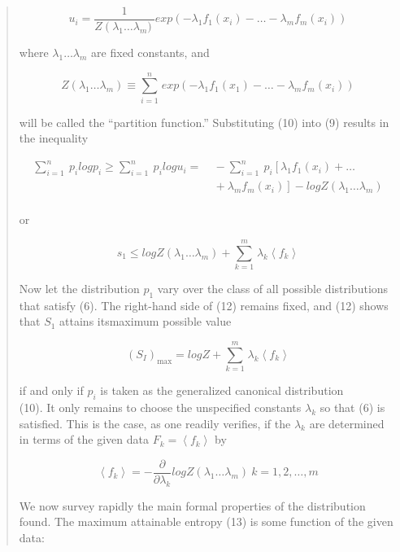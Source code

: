 \documentclass[]{article}
\begin{document}
\begin{quote}
\[u_{i} = \frac{1}{Z\left( \lambda_{1}\ldots\lambda_{m}) \right.\ }exp\left( - \lambda_{1}f_{1}\left( x_{i} \right) - \ldots - \lambda_{m}f_{m}\left( x_{i} \right) \right)\]

where \(\lambda_{1}\ldots\lambda_{m}\) are fixed constants, and

\[Z\left( \lambda_{1}\ldots\lambda_{m} \right) \equiv \sum_{i = 1}^{n}\mspace{2mu} exp\left( - \lambda_{1}f_{1}\left( x_{1} \right) - \ldots - \lambda_{m}f_{m}\left( x_{i} \right) \right)\]

will be called the ``partition function.'' Substituting (10) into (9)
results in the inequality

\[\begin{matrix}
\sum_{i = 1}^{n}\mspace{2mu}\mspace{2mu} p_{i}logp_{i} \geq \sum_{i = 1}^{n}\mspace{2mu}\mspace{2mu} p_{i}logu_{i} = & \  - \sum_{i = 1}^{n}\mspace{2mu}\mspace{2mu} p_{i}\left\lbrack \lambda_{1}f_{1}\left( x_{i} \right) + \ldots \right.\  \\
 & \left. \  + \lambda_{m}f_{m}\left( x_{i} \right) \right\rbrack - logZ\left( \lambda_{1}\ldots\lambda_{m} \right) \\
\end{matrix}\]

or

\[s_{1} \leq logZ\left( \lambda_{1}\ldots\lambda_{m} \right) + \sum_{k = 1}^{m}\mspace{2mu}\lambda_{k}\left\langle f_{k} \right\rangle\]

Now let the distribution \(p_{1}\) vary over the class of all possible
distributions that satisfy (6). The right-hand side of (12) remains
fixed, and (12) shows that \(S_{1}\) attains itsmaximum possible value

\[\left( S_{I} \right)_{\max} = logZ + \sum_{k = 1}^{m}\mspace{2mu}\lambda_{k}\left\langle f_{k} \right\rangle\]

if and only if \(p_{i}\) is taken as the generalized canonical
distribution\\
(10). It only remains to choose the unspecified constants
\(\lambda_{k}\) so that (6) is satisfied. This is the case, as one
readily verifies, if the \(\lambda_{k}\) are determined in terms of the
given data \(F_{k} = \left\langle f_{k} \right\rangle\) by

\[\left\langle f_{k} \right\rangle = - \frac{\partial}{\partial\lambda_{k}}logZ\left( \lambda_{1}\ldots\lambda_{m} \right)\ k = 1,2,\ldots,m\]

We now survey rapidly the main formal properties of the distribution
found. The maximum attainable entropy (13) is some function of the given
data:


\end{quote}
\end{document}
